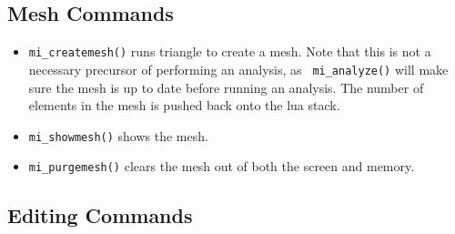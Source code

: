 \subsection{Mesh Commands}

\begin{itemize}
\item{\tt mi\_createmesh()} runs triangle to create a mesh. Note that this is not a
necessary precursor of performing an analysis, as {\tt
mi\_analyze()} will make sure the mesh is up to date before running
an analysis. The number of elements in the mesh is pushed back onto
the lua stack.

\item{\tt mi\_showmesh()} shows the mesh.

\item{\tt mi\_purgemesh()} clears the mesh out of both the screen and
memory.
\end{itemize}

\subsection{Editing Commands}

